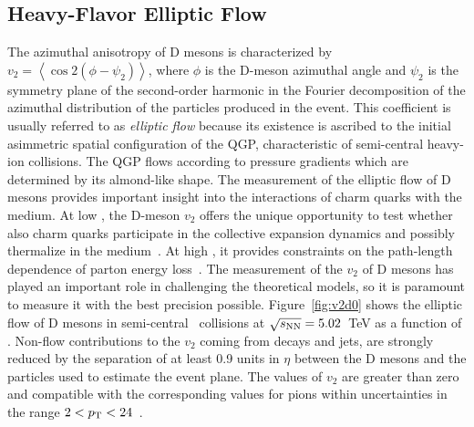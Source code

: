 \documentclass[10pt]{article}
\begin{document}
\subsection{Heavy-Flavor Elliptic Flow}
The azimuthal anisotropy of D mesons is characterized by $v_2= \left<\cos 2(\phi - \psi_2)\right>$, where $\phi$ is the D-meson azimuthal angle and $\psi_2$ is the symmetry plane of the second-order
harmonic in the Fourier decomposition of the azimuthal distribution of the particles produced in the event.
This coefficient is usually referred to as \emph{elliptic flow} because its existence is ascribed to the initial asimmetric spatial configuration of the QGP, characteristic of semi-central heavy-ion collisions.
The QGP flows according to pressure gradients which are determined by its almond-like shape.
The measurement of the elliptic flow of D mesons provides important insight into the interactions of charm quarks with the
medium. At low \pt, the D-meson $v_2$ offers the unique opportunity to test whether also charm quarks participate in
the collective expansion dynamics and possibly thermalize in the medium~\cite{}. At high \pt, it provides constraints on the path-length dependence of parton energy loss~\cite{}.
The measurement of the $v_2$ of D mesons has played an important role in challenging
the theoretical models, so it is paramount to measure it with the best precision possible.
Figure~\ref{fig:v2d0} shows the elliptic flow of D mesons in semi-central \PbPb\ collisions at $\sqrt{s_{\rm NN}}=5.02$~TeV as a function of \pt.
Non-flow contributions to the $v_2$ coming from decays and jets, are strongly
reduced by the separation of at least 0.9 units in $\eta$ between the D mesons and the particles used
to estimate the event plane. 
The values of $v_2$ are greater than zero and compatible with the corresponding values for pions within uncertainties in the range $2<p_{\rm T}<24$~\GeVc.
\end{document}
